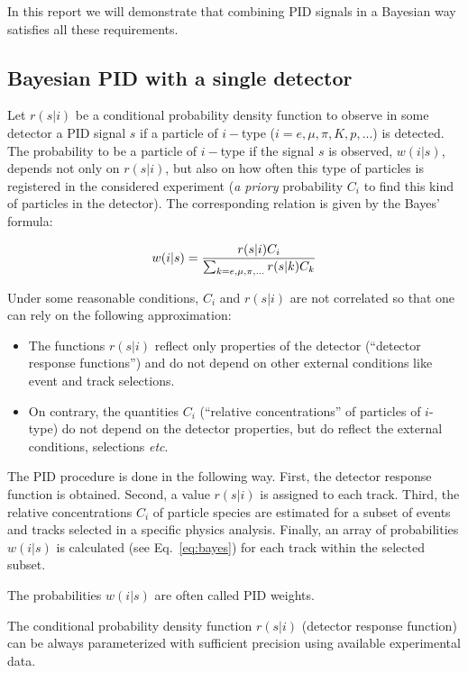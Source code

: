 \documentclass[12pt,a4paper,twoside]{article}
\begin{document}
{In this report we will demonstrate that combining PID signals in a Bayesian way
satisfies all these requirements.

\subsection{Bayesian PID with a single detector}
Let $r(s|i)$ be a conditional probability density function to observe in some
detector a PID signal $s$ if a particle of $i-$type 
($i=e, \mu, \pi, K, p, ...$) 
is detected.  The probability to be a particle of $i-$type if the signal
$s$ is observed, $w(i|s)$, depends not only on $r(s|i)$, but also
on how often this type of particles is registered in the considered experiment
({\it a priory} probability $C_i$ to find this
kind of particles in the detector).  The corresponding relation is
given by the Bayes' formula:

\begin{equation}\label{eq:bayes}
  w(i|s)={r(s|i) C_i  \over \sum_{k=e, \mu, \pi, ...}{r(s|k) C_k}}
\end{equation}

Under some reasonable conditions, $C_i$ and $r(s|i)$ are not correlated
so that one can rely on the following approximation:
\begin{itemize}
\item The functions $r(s|i)$ reflect only properties of the detector
(``detector response functions'') and do not depend on
other external conditions like event and track selections.
\item On contrary, the quantities $C_i$ (``relative concentrations'' of
particles of $i$-type) do not depend on the detector
properties, but do reflect the external conditions, selections {\it etc}.
\end{itemize} 

The PID procedure is done in the following way. First,
 the detector response
function is obtained. Second, a value $r(s|i)$ is assigned to
each track.
Third, the relative concentrations $C_i$ of particle species are
 estimated for a subset of events and tracks selected in a specific
physics analysis.
Finally, an array of probabilities $w(i|s)$ is calculated (see Eq.~\ref{eq:bayes}) for each track within the selected
subset.

The probabilities $w(i|s)$ are often called PID weights. 

The conditional probability density function $r(s|i)$ 
(detector response function) can be always parameterized with sufficient
precision using available experimental data.

}
\end{document}
